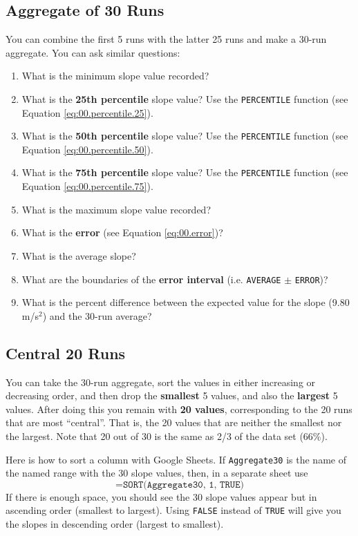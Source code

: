 \subsection{Aggregate of 30 Runs} \label{sec:01.all.30}
%
You can combine the first 5 runs with the latter 25 runs and make a 30-run aggregate. You can ask similar questions:
\begin{enumerate}
    \item What is the minimum slope value recorded?
    \item What is the \textbf{25th percentile} slope value? Use the \texttt{PERCENTILE} function (see Equation \ref{eq:00.percentile.25}).
    \item What is the \textbf{50th percentile} slope value? Use the \texttt{PERCENTILE} function (see Equation \ref{eq:00.percentile.50}).
    \item What is the \textbf{75th percentile} slope value? Use the \texttt{PERCENTILE} function (see Equation \ref{eq:00.percentile.75}).
    \item What is the maximum slope value recorded?
    \item What is the \textbf{error} (see Equation \ref{eq:00.error})?
    \item What is the average slope?
    \item What are the boundaries of the \textbf{error interval} (i.e. \texttt{AVERAGE} $\pm$ \texttt{ERROR})?
    \item What is the percent difference between the expected value for the slope (9.80 m/s$^{2}$) and the 30-run average?
\end{enumerate}
%
\subsection{Central 20 Runs} \label{sec:01.central.20}
%
You can take the 30-run aggregate, sort the values in either increasing or decreasing order, and then drop the \textbf{smallest} 5 values, and also the \textbf{largest} 5 values. After doing this you remain with \textbf{20 values}, corresponding to the 20 runs that are most ``central''. That is, the 20 values that are neither the smallest nor the largest. Note that 20 out of 30 is the same as 2/3 of the data set (66\%).

Here is how to sort a column with Google Sheets. If \texttt{Aggregate30} is the name of the named range with the 30 slope values, then, in a separate sheet use
\begin{equation}
    \texttt{=SORT(Aggregate30, 1, TRUE)}
\end{equation}
If there is enough space, you should see the 30 slope values appear but in ascending order (smallest to largest). Using \texttt{FALSE} instead of \texttt{TRUE} will give you the slopes in descending order (largest to smallest).

